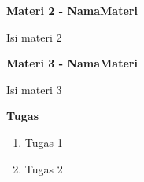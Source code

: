 \documentclass{article}
\begin{document}
    \begin{flushleft}
        \textbf{Materi 2 - NamaMateri}
        \newline

        Isi materi 2
    \end{flushleft}

    \begin{flushleft}
        \textbf{Materi 3 - NamaMateri}
        \newline

        Isi materi 3
    \end{flushleft}

    \newpage
    \begin{flushleft}
        \textbf{Tugas}
        \newline

        \begin{enumerate}
            \item Tugas 1
            \item Tugas 2
        \end{enumerate}
    \end{flushleft}
\end{document}
